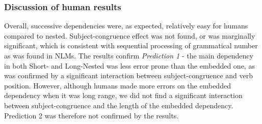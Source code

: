     \subsubsection{Discussion of human results}
Overall, successive dependencies were, as expected, relatively easy for humans compared to nested. Subject-congruence effect was not found, or was marginally significant, which is consistent with sequential processing of grammatical number as was found in NLMs. The results confirm \textit{Prediction 1} - the main dependency in both Short- and Long-Nested was less error prone than the embedded one, as was confirmed by a significant interaction between subject-congruence and verb position. However, although humans made more errors on the embedded dependency when it was long range, we did not find a significant interaction between subject-congruence and the length of the embedded dependency. Prediction 2 was therefore not confirmed by the results. 

\vspace{10pt}




